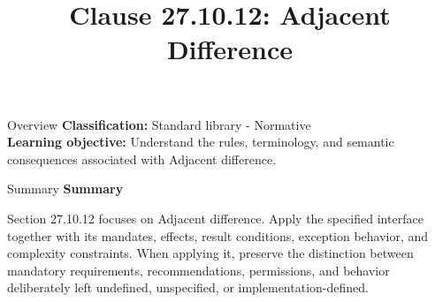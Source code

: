 \documentclass[10pt,letterpaper]{article}
\title{Clause 27.10.12: Adjacent Difference}
\author{}
\date{}
\begin{document}
\maketitle
\begin{CornellOverviewBox}{Overview}
\textbf{Classification:} Standard library - Normative\\[2pt]
\textbf{Learning objective:} Understand the rules, terminology, and semantic consequences associated with Adjacent difference.
\end{CornellOverviewBox}\begin{CornellSummaryBox}{Summary}
{\sffamily\bfseries\color{Accent} Summary}\par\vspace{3pt}Section 27.10.12 focuses on Adjacent difference. Apply the specified interface together with its mandates, effects, result conditions, exception behavior, and complexity constraints. When applying it, preserve the distinction between mandatory requirements, recommendations, permissions, and behavior deliberately left undefined, unspecified, or implementation-defined.
\end{CornellSummaryBox}
\end{document}
